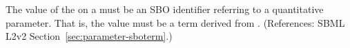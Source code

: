 The value of the   on a \Parameter must be an SBO
identifier referring to a quantitative parameter.  That is, the value must
be a term derived from \sboparameter.  (References: SBML L2v2
Section~\ref{sec:parameter-sboterm}.)
